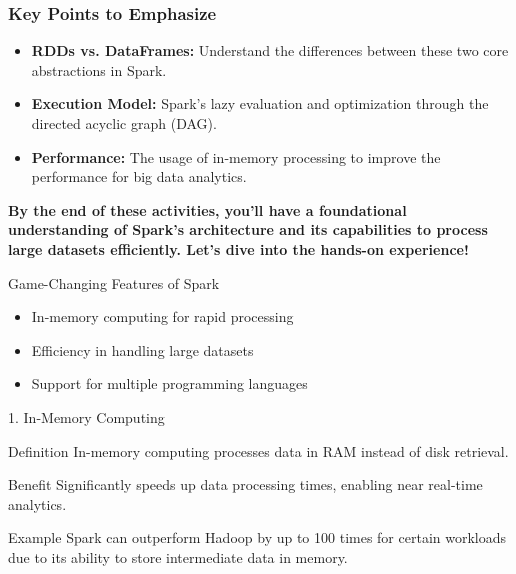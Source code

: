 \documentclass[aspectratio=169]{beamer}
\begin{document}
\begin{frame}[fragile]
    \frametitle{Key Points to Emphasize}
    \begin{itemize}
        \item \textbf{RDDs vs. DataFrames:} Understand the differences between these two core abstractions in Spark.
        \item \textbf{Execution Model:} Spark's lazy evaluation and optimization through the directed acyclic graph (DAG).
        \item \textbf{Performance:} The usage of in-memory processing to improve the performance for big data analytics.
    \end{itemize}
    \textbf{By the end of these activities, you'll have a foundational understanding of Spark’s architecture and its capabilities to process large datasets efficiently. Let’s dive into the hands-on experience!}
\end{frame}

\begin{frame}{Game-Changing Features of Spark}
  \begin{itemize}
    \item In-memory computing for rapid processing
    \item Efficiency in handling large datasets
    \item Support for multiple programming languages
  \end{itemize}
\end{frame}

\begin{frame}{1. In-Memory Computing}
  \begin{block}{Definition}
    In-memory computing processes data in RAM instead of disk retrieval.
  \end{block}
  
  \begin{block}{Benefit}
    Significantly speeds up data processing times, enabling near real-time analytics.
  \end{block}
  
  \begin{block}{Example}
    Spark can outperform Hadoop by up to 100 times for certain workloads due to its ability to store intermediate data in memory.
  \end{block}
\end{frame}
\end{document}
